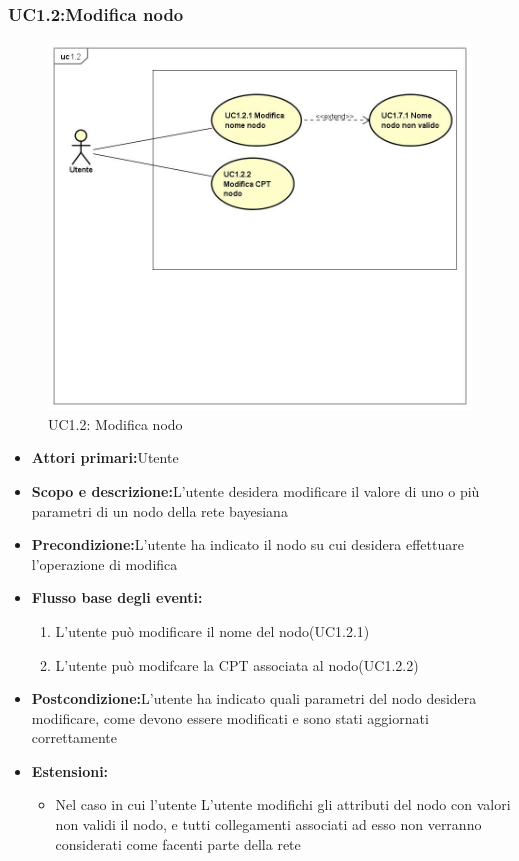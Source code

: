 \subsubsection{UC1.2:Modifica nodo}
\begin{figure} [H]
	\centering
	\includegraphics[scale=0.45]{Img/UC1-2}
	\caption{UC1.2: Modifica nodo}\label{}
\end{figure}
\begin{itemize}
	\item{\textbf{Attori primari:}Utente}
	\item{\textbf{Scopo e descrizione:}L'utente desidera modificare il valore di uno o più parametri di un nodo della rete bayesiana}
	\item{\textbf{Precondizione:}L'utente ha indicato il nodo su cui desidera effettuare l'operazione di modifica}
	\item{\textbf{Flusso base degli eventi:}}
		\begin{enumerate}
			\item{L'utente può modificare il nome del nodo(UC1.2.1)}
			\item{L'utente può modifcare la CPT associata al nodo(UC1.2.2)}		
		\end{enumerate}
	\item{\textbf{Postcondizione:}L'utente ha indicato quali parametri del nodo desidera modificare, come devono essere modificati e sono stati aggiornati correttamente}
	\item{\textbf{Estensioni:}}
		\begin{itemize}
			\item{Nel caso in cui l'utente L'utente modifichi gli attributi del nodo con valori non validi il nodo, e tutti collegamenti associati ad esso non verranno considerati come facenti parte della rete}
		\end{itemize}
\end{itemize}
